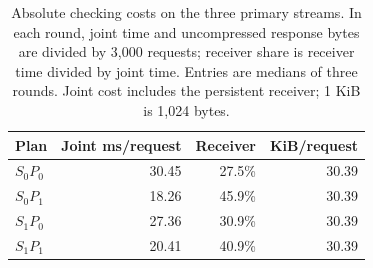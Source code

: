 \begin{table}[t]
\centering\small
\caption{Absolute checking costs on the three primary streams. In each round, joint time and uncompressed response bytes are divided by 3,000 requests; receiver share is receiver time divided by joint time. Entries are medians of three rounds. Joint cost includes the persistent receiver; 1 KiB is 1,024 bytes.}
\label{tab:absolute-checking}
\begin{tabular}{lrrr}
\toprule
Plan & Joint ms/request & Receiver & KiB/request \\
\midrule
$S_0P_0$ & 30.45 & 27.5\% & 30.39 \\
$S_0P_1$ & 18.26 & 45.9\% & 30.39 \\
$S_1P_0$ & 27.36 & 30.9\% & 30.39 \\
$S_1P_1$ & 20.41 & 40.9\% & 30.39 \\
\bottomrule
\end{tabular}
\end{table}
